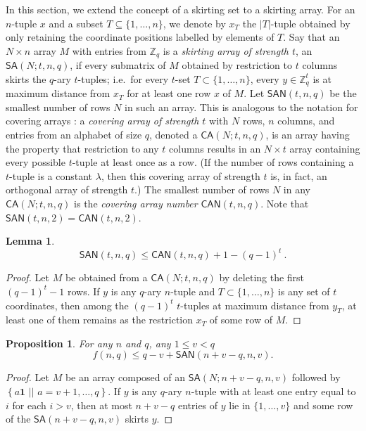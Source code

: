 \documentclass[12pt,reqno]{article}
\newtheorem{lm}[thm]{Lemma}
\newtheorem{prop}[thm]{Proposition}
\newcommand{\ZZ}{\mathbb Z}
\newcommand{\one}{\mathbf 1}
\newcommand{\SA}{\mathsf{SA}}
\newcommand{\SAN}{\mathsf{SAN}}
\newcommand{\CA}{\mathsf{CA}}
\newcommand{\CAN}{\mathsf{CAN}}
\newcommand{\sett}[2]{ \left\{ #1 \, \, || \, \, #2 \right \} }
\begin{document}
In this section, we extend the concept of a skirting set to a skirting array.
For an $n$-tuple $x$ and a subset $T \subseteq \{1, \dots, n\}$, we denote by $x_T$ the $|T|$-tuple obtained by only retaining the coordinate positions labelled by elements of $T$.
Say that an $N\times n$ 
array $M$ with entries from $\ZZ_q$ is a  \emph{skirting array of strength $t$}, an $\SA(N;t,n,q)$, if every 
submatrix of $M$ obtained by restriction to $t$ columns skirts the $q$-ary $t$-tuples; i.e.\ for every $t$-set
$T \subset \{1,\ldots,n\}$,  every $y\in \ZZ_q^t$ is at maximum distance from $x_T$ for at least one row $x$ of $M$.
Let $\SAN(t,n,q)$ be the smallest number of rows $N$ in such an array. This is analogous to the notation for 
covering arrays \cite[Section VI.10]{Handbook2006}:  a \emph{covering array of strength $t$} with $N$ rows, 
$n$ columns, and entries from an alphabet of size $q$, denoted a $\CA(N;t,n,q)$, is an array
having the property that restriction to any $t$ columns results in an $N\times t$ array containing every 
possible $t$-tuple at least once as a row. (If the number  of rows containing a $t$-tuple is a constant 
$\lambda$, then this covering array of strength $t$ is, in fact, an orthogonal array of strength $t$.) The 
smallest number of rows $N$ in any $\CA(N;t,n,q)$ is the \emph{covering array number} $\CAN(t,n,q)$. 
Note that $\SAN(t,n,2)=\CAN(t,n,2)$. 

\begin{lm} \label{Lem:CAtoSA}
\[ 
\SAN(t,n,q) \le \CAN(t,n,q) + 1 - (q-1)^t~. 
\]
\end{lm}

\begin{proof}
Let $M$ be obtained from  a $\CA(N;t,n,q)$  by deleting the first $(q-1)^t-1$ rows. If $y$ is any $q$-ary 
$n$-tuple and $T \subset \{1,\ldots,n\}$ is any set of $t$ coordinates, then among the $(q-1)^t$
$t$-tuples at maximum distance from $y_T$, at least one of them remains as the restriction $x_T$
of some row of $M$. 
\end{proof}

\begin{prop}
For any $n$ and $q$, any $1\le v<q$
\[
f(n,q) \le q-v + \SAN(n+v-q,n,v).
\]
\end{prop}

\begin{proof}
Let $M$ be an array composed of an $\SA(N; n+v-q,n,v)$ followed by $\sett{a \one}{ a = v+1, \dots, q}$. If $y$ is any $q$-ary 
$n$-tuple with at least one entry equal to $i$ for each $i>v$, then at most $n+v-q$ entries of $y$ lie in $\{1,\ldots,v\}$
and some row of the $\SA(n+v-q,n,v)$ skirts $y$.
\end{proof}
\end{document}
